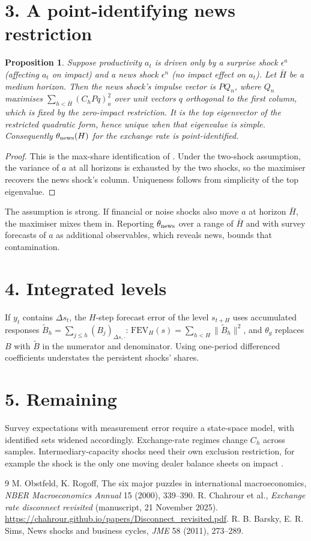 \documentclass[11pt]{article}
\newtheorem{proposition}[theorem]{Proposition}
\theoremstyle{definition}
\begin{document}
\section*{3. A point-identifying news restriction}
\begin{proposition}\label{prop:maxshare}
Suppose productivity $a_t$ is driven only by a surprise shock $\epsilon^a$ (affecting $a_t$ on impact) and a news shock
$\epsilon^n$ (no impact effect on $a_t$). Let $\bar H$ be a medium horizon. Then the news shock's impulse vector is
$PQ_n$, where $Q_n$ maximises $\sum_{h<\bar H}(C_hPq)_a^2$ over unit vectors $q$ orthogonal to the first column, which
is fixed by the zero-impact restriction. It is the top eigenvector of the restricted quadratic form, hence unique when that
eigenvalue is simple. Consequently $\theta_{\rm news}(H)$ for the exchange rate is point-identified.
\end{proposition}
\begin{proof}
This is the max-share identification of \cite{bs}. Under the two-shock assumption, the variance of $a$ at all horizons is
exhausted by the two shocks, so the maximiser recovers the news shock's column. Uniqueness follows from simplicity of the
top eigenvalue.
\end{proof}
The assumption is strong. If financial or noise shocks also move $a$ at horizon $\bar H$, the maximiser mixes them in.
Reporting $\theta_{\rm news}$ over a range of $\bar H$ and with survey forecasts of $a$ as additional observables, which
reveals news, bounds that contamination.

\section*{4. Integrated levels}
If $y_t$ contains $\Delta s_t$, the $H$-step forecast error of the level $s_{t+H}$ uses accumulated responses
$\tilde B_h=\sum_{j\le h}(B_j)_{\Delta s,\cdot}$:
$\mathrm{FEV}_H(s)=\sum_{h<H}\|\tilde B_h\|^2$, and $\theta_g$ replaces $B$ with $\tilde B$ in the numerator and
denominator. Using one-period differenced coefficients understates the persistent shocks' shares.

\section*{5. Remaining}
Survey expectations with measurement error require a state-space model, with identified sets widened accordingly.
Exchange-rate regimes change $C_h$ across samples. Intermediary-capacity shocks need their own exclusion restriction, for
example the shock is the only one moving dealer balance sheets on impact \cite{or,crs}.

\begin{thebibliography}{9}
 M. Obstfeld, K. Rogoff, The six major puzzles in international macroeconomics, \emph{NBER Macroeconomics Annual} 15 (2000), 339--390.
 R. Chahrour et al., \emph{Exchange rate disconnect revisited} (manuscript, 21 November 2025). \url{https://chahrour.github.io/papers/Disconnect_revisited.pdf}.
 R. B. Barsky, E. R. Sims, News shocks and business cycles, \emph{JME} 58 (2011), 273--289.
\end{thebibliography}
\end{document}
